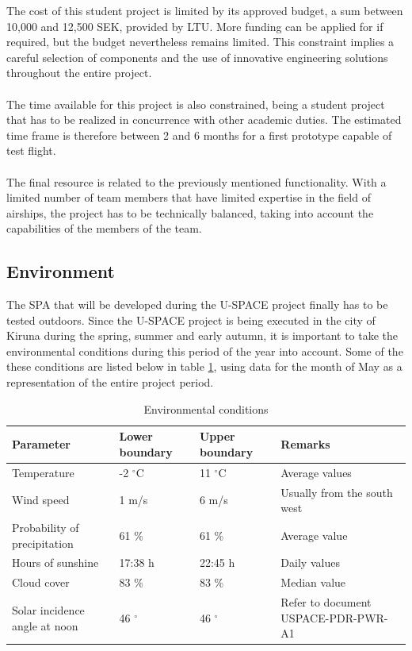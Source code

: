 \noindent
The cost of this student project is limited by its approved budget, a sum between 10,000 and 12,500 SEK, provided by \ac{LTU}. More funding can be applied for if required, but the budget nevertheless remains limited. This constraint implies a careful selection of components and the use of innovative engineering solutions throughout the entire project. 
\\
\\
The time available for this project is also constrained, being a student project that has to be realized in concurrence with other academic duties. The estimated time frame is therefore between 2 and 6 months for a first prototype capable of test flight.
\\
\\
The final resource is related to the previously mentioned functionality. With a limited number of team members that have limited expertise in the field of airships, the project has to be technically balanced, taking into account the capabilities of the members of the team.

\subsection{Environment}

The \ac{SPA} that will be developed during the \ac{U-SPACE} project finally has to be tested outdoors. Since the \ac{U-SPACE} project is being executed in the city of Kiruna during the spring, summer and early autumn, it is important to take the environmental conditions during this period of the year into account.  Some of the these conditions are listed below in table \ref{tab:environment}, using data for the month of May \cite{website:weatherspark} as a representation of the entire project period.

\begin{table}[H]
\centering
\caption{Environmental conditions}
\label{tab:environment}
\begin{tabular}{p{} p{} p{} p{}}
\hline
\textbf{Parameter} & \textbf{Lower boundary} & \textbf{Upper boundary} & \textbf{Remarks}\\ \hline
Temperature & -2 $^\circ$C & 11 $^\circ$C & Average values\\
Wind speed & 1 m/s & 6 m/s & Usually from the south west\\
Probability of precipitation & 61 \% & 61 \% & Average value\\
Hours of sunshine & 17:38 h & 22:45 h & Daily values\\
Cloud cover & 83 \% & 83 \% & Median value\\
Solar incidence angle at noon & 46 $^\circ$ & 46 $^\circ$ & Refer to document USPACE-PDR-PWR-A1\\
\hline
\end{tabular}
\end{table}

